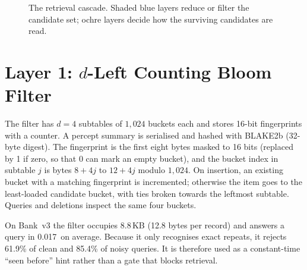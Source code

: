 \documentclass[12pt,a4paper,oneside]{report}
\newcommand{\ms}{\,\text{ms}}
\begin{document}
\begin{figure}[H]
\centering
{}
\caption{The retrieval cascade. Shaded blue layers reduce or filter the candidate set; ochre layers decide how the surviving candidates are read.}
\label{fig:cascade}
\end{figure}

\section{Layer 1: $d$-Left Counting Bloom Filter}
The filter has $d = 4$ subtables of $1{,}024$ buckets each and stores 16-bit fingerprints with a counter. A percept summary is serialised and hashed with BLAKE2b (32-byte digest). The fingerprint is the first eight bytes masked to 16 bits (replaced by 1 if zero, so that 0 can mark an empty bucket), and the bucket index in subtable $j$ is bytes $8+4j$ to $12+4j$ modulo $1{,}024$. On insertion, an existing bucket with a matching fingerprint is incremented; otherwise the item goes to the least-loaded candidate bucket, with ties broken towards the leftmost subtable. Queries and deletions inspect the same four buckets.

On Bank~v3 the filter occupies 8.8\,KB (12.8 bytes per record) and answers a query in 0.017\ms{} on average. Because it only recognises exact repeats, it rejects 61.9\% of clean and 85.4\% of noisy queries. It is therefore used as a constant-time ``seen before'' hint rather than a gate that blocks retrieval.
\end{document}
